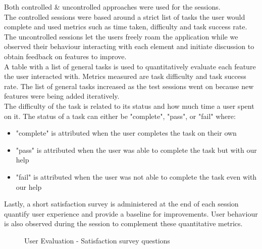 \noindent Both controlled \& uncontrolled approaches were used for the sessions.\\
The controlled sessions were based around a strict list of tasks the user would complete and used metrics such as time taken, difficulty and task success rate.\\
The uncontrolled sessions let the users freely roam the application while we observed their behaviour interacting with each element and initiate discussion to obtain feedback on features to improve.\\

\noindent A table with a list of general tasks is used to quantitatively evaluate each feature the user interacted with. Metrics measured are task difficulty and task success rate. The list of general tasks increased as the test sessions went on because new features were being added iteratively.\\
The difficulty of the task is related to its status and how much time a user spent on it. The status of a task can either be "complete", "pass", or "fail" where:
\begin{itemize}
    \item "complete" is attributed when the user completes the task on their own
    \item "pass" is attributed when the user was able to complete the task but with our help
    \item "fail" is attributed when the user was not able to complete the task even with our help
\end{itemize}
Lastly, a short satisfaction survey is administered at the end of each session quantify user experience and provide a baseline for improvements. User behaviour is also observed during the session to complement these quantitative metrics.\\
\begin{figure}
    \centering
    \caption{User Evaluation - Satisfaction survey questions}
\end{figure}

